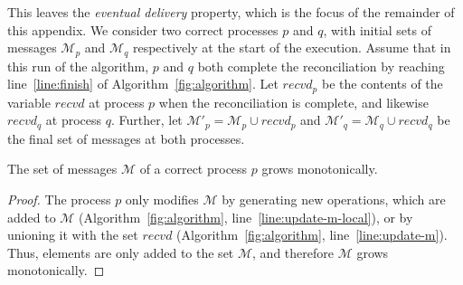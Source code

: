 \documentclass[a4paper,anonymous,USenglish]{lipics-v2019}
\begin{document}
This leaves the \emph{eventual delivery} property, which is the focus of the remainder of this appendix.
We consider two correct processes $p$ and $q$, with initial sets of messages $\mathcal{M}_p$ and $\mathcal{M}_q$ respectively at the start of the execution.
Assume that in this run of the algorithm, $p$ and $q$ both complete the reconciliation by reaching line~\ref{line:finish} of Algorithm~\ref{fig:algorithm}.
Let $\mathit{recvd}_p$ be the contents of the variable $\mathit{recvd}$ at process $p$ when the reconciliation is complete, and likewise $\mathit{recvd}_q$ at process $q$.
Further, let $\mathcal{M}'_p = \mathcal{M}_p \cup \mathit{recvd}_p$ and $\mathcal{M}'_q = \mathcal{M}_q \cup \mathit{recvd}_q$ be the final set of messages at both processes.

\begin{lemma}\label{lemma:no-p-missing}
The set of messages $\mathcal{M}$ of a correct process $p$ grows monotonically.
\end{lemma}
\begin{proof}
The process $p$ only modifies $\mathcal{M}$ by generating new operations, which are added to $\mathcal{M}$ (Algorithm~\ref{fig:algorithm}, line~\ref{line:update-m-local}), or by unioning it with the set $\mathit{recvd}$ (Algorithm~\ref{fig:algorithm}, line~\ref{line:update-m}).
Thus, elements are only added to the set $\mathcal{M}$, and therefore $\mathcal{M}$ grows monotonically.
\end{proof}
\end{document}

